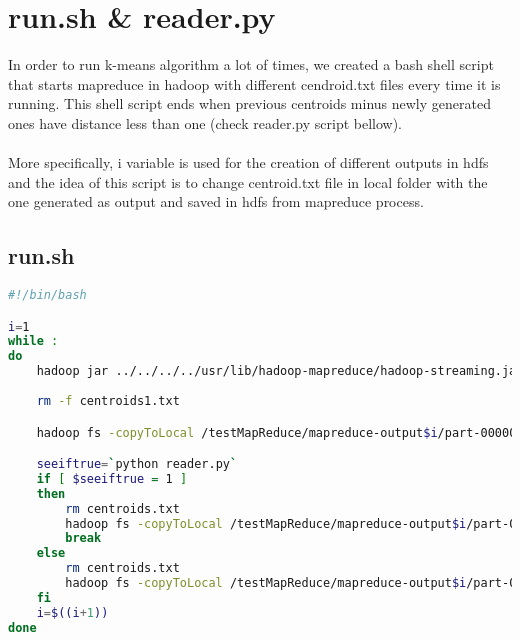 
\section{run.sh \& reader.py}
In order to run k-means algorithm a lot of times, we created a bash shell script that starts mapreduce in hadoop with different cendroid.txt files every time it is running. This shell script ends when previous centroids minus newly generated ones have distance less than one (check reader.py script bellow). \\\\
More specifically, i variable is used for the creation of different outputs in hdfs and the idea of this script is to change centroid.txt file in local folder with the one generated as output and saved in hdfs from mapreduce process.
\newpage
\subsection{run.sh}
\begin{lstlisting}[language=bash]
#!/bin/bash

i=1
while :
do
	hadoop jar ../../../../usr/lib/hadoop-mapreduce/hadoop-streaming.jar -file centroids.txt -file ./mapper.py -mapper ./mapper.py -file ./reducer.py -reducer ./reducer.py -input /testMapReduce/dataset -output /testMapReduce/mapreduce-output$i
		
	rm -f centroids1.txt

	hadoop fs -copyToLocal /testMapReduce/mapreduce-output$i/part-00000 centroids1.txt

	seeiftrue=`python reader.py`
	if [ $seeiftrue = 1 ]
	then
		rm centroids.txt
		hadoop fs -copyToLocal /testMapReduce/mapreduce-output$i/part-00000 centroids.txt
		break
	else
		rm centroids.txt
		hadoop fs -copyToLocal /testMapReduce/mapreduce-output$i/part-00000 centroids.txt
	fi
	i=$((i+1))
done	
\end{lstlisting}

